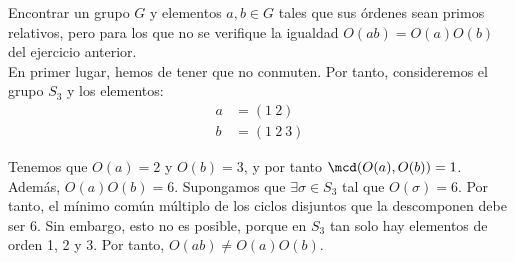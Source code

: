 \begin{ejercicio}\label{ej:3.6}
    Encontrar un grupo $G$ y elementos $a, b \in G$ tales que sus órdenes sean primos relativos, pero para los que no se verifique la igualdad $O(ab) = O(a)O(b)$ del ejercicio anterior.\\

    En primer lugar, hemos de tener que no conmuten. Por tanto, consideremos el grupo $S_3$ y los elementos:
    \begin{align*}
        a &= (1\ 2)\\
        b &= (1\ 2\ 3)
    \end{align*}

    Tenemos que $O(a)=2$ y $O(b)=3$, y por tanto $\mcd(O(a),O(b))=1$. Además, $O(a)O(b)=6$. Supongamos que $\exists \sigma\in S_3$ tal que $O(\sigma)=6$. Por tanto, el mínimo común múltiplo de los ciclos disjuntos que la descomponen debe ser 6. Sin embargo, esto no es posible, porque en $S_3$ tan solo hay elementos de orden 1, 2 y 3. Por tanto, $O(ab)\neq O(a)O(b)$.
\end{ejercicio}

